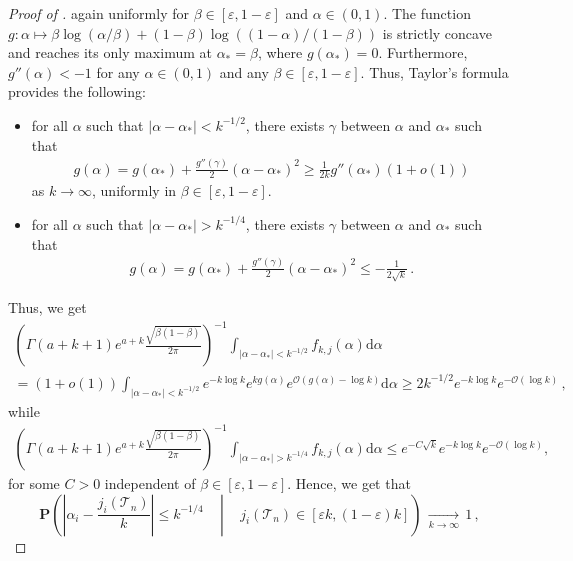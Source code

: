 \documentclass{article}
\theoremstyle{remark}
\newcommand{\cO}{\mathcal{O}}
\newcommand{\cv}[1]{\,\underset{#1}{\longrightarrow}\,}
\newcommand{\abs}[1]{{\left|#1\right|}}
\newcommand{\cT}{\mathcal{T}}
\newcommand{\probcond}[2]{\mathbf{P}{\left(\left. #1 \,\right|\, #2 \right)}}
\begin{document}
\begin{proof}[Proof of ]
again uniformly for $\beta \in [\varepsilon, 1-\varepsilon]$ and $\alpha \in (0,1)$. 
The function $g: \alpha\mapsto  \beta \log(\alpha/\beta)+ (1-\beta) \log((1-\alpha)/(1-\beta))$ is strictly concave and reaches its only maximum at $\alpha_*=\beta$, where $g(\alpha_*)=0$. 
Furthermore, $g''(\alpha)<-1$ for any $\alpha \in (0,1)$ and any $\beta \in [\varepsilon, 1-\varepsilon]$. 
Thus, Taylor's formula provides the following:
\begin{itemize}
    \item for all $\alpha$ such that $|\alpha-\alpha_*|<k^{-1/2}$, there exists $\gamma$ between $\alpha$ and $\alpha_*$ such that
    \begin{align*}
    g(\alpha)
    =g(\alpha_*)+\frac{g''(\gamma)}{2}(\alpha-\alpha_*)^2
    \ge \frac{1}{2k} g''(\alpha_*)(1+o(1))
    \end{align*}
    as $k \rightarrow \infty$, uniformly in $\beta \in [\varepsilon, 1-\varepsilon]$.
    \item for all $\alpha$ such that $|\alpha-\alpha_*|>k^{-1/4}$, there exists $\gamma$ between $\alpha$ and $\alpha_*$ such that
    \begin{align*}
    g(\alpha)
    =g(\alpha_*)+\frac{g''(\gamma)}{2}(\alpha-\alpha_*)^2
    \le -\frac{1}{2\sqrt{k}} \,.
    \end{align*}
\end{itemize}
Thus, we get
\begin{multline*}
    \left(\Gamma(a+k+1) e^{a+k} \frac{\sqrt{\beta(1-\beta)}}{2\pi}\right)^{-1}\int_{|\alpha-\alpha_*|<k^{-1/2}} f_{k,j}(\alpha) \mathrm d\alpha 
    \\= (1+o(1)) \int_{|\alpha-\alpha_*|<k^{-1/2}} e^{-k \log k}e^{kg(\alpha)} e^{\cO(g(\alpha)-\log k)} \mathrm d\alpha
    \ge 2k^{-1/2}e^{-k \log k} e^{-\cO(\log k)} \,,
\end{multline*}
while
\begin{align*}
    \left(\Gamma(a+k+1) e^{a+k} \frac{\sqrt{\beta(1-\beta)}}{2\pi}\right)^{-1} \int_{|\alpha-\alpha_*| 
    > k^{-1/4}} f_{k,j}(\alpha) \mathrm d\alpha 
    \le e^{- C\sqrt{k}}e^{-k \log k}e^{-\cO(\log k)},
\end{align*}
for some $C>0$ independent of $\beta \in [\varepsilon, 1-\varepsilon]$. 
Hence, we get that
\begin{equation}
\label{eq: cv of alpha}
    \probcond{ \abs{\alpha_i-\frac{j_i(\cT_n)}{k}} \le k^{-1/4} \quad}{\quad j_i(\cT_n) \in [\varepsilon k, (1-\varepsilon)k] } \cv{k\to\infty} 1 \,,

\end{equation}
\end{proof}
\end{document}
